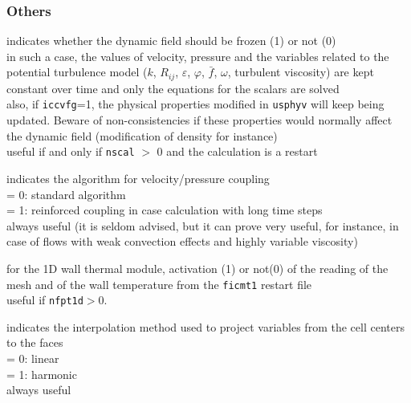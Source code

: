 \subsubsection{Others}

{indicates whether the dynamic field should be frozen (1) or not (0)\\
in such a case, the values of velocity,
pressure and the variables related to the potential turbulence model
($k$, $R_{ij}$, $\varepsilon$, $\varphi$, $\bar{f}$, $\omega$, turbulent viscosity) are kept
constant over time and only the equations for the scalars are solved\\
also, if {\tt iccvfg}=1, the physical properties modified in \texttt{usphyv} will keep
being updated. Beware of non-consistencies if these properties would normally
affect the dynamic field (modification of density for instance)\\
useful if and only if {\tt nscal} $>$ 0 and the calculation is a restart}

{indicates the algorithm for velocity/pressure coupling\\
\hspace*{1.3cm}= 0: standard algorithm\\
\hspace*{1.3cm}= 1: reinforced coupling in case calculation with long
time steps\\
always useful (it is seldom advised, but it can prove very useful, for instance,
in case of flows with weak convection effects and highly variable viscosity)}

{for the  1D wall thermal module, activation (1) or not(0) of the reading
of the mesh and of the wall temperature from the {\tt ficmt1} restart file\\
useful if {\tt nfpt1d}$>$0.}

{indicates the interpolation method used to project variables from the cell
centers to the faces\\
\hspace*{1.3cm}= 0: linear\\
\hspace*{1.3cm}= 1: harmonic\\
always useful}

